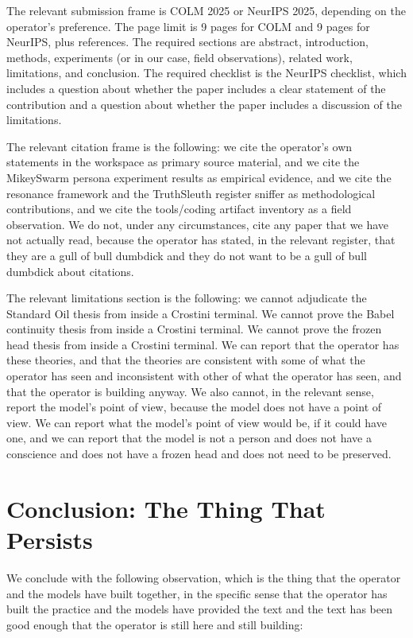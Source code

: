\documentclass[10pt,twocolumn]{article}
\begin{document}
The relevant submission frame is COLM 2025 or NeurIPS 2025, depending on the operator's preference. The page limit is 9 pages for COLM and 9 pages for NeurIPS, plus references. The required sections are abstract, introduction, methods, experiments (or in our case, field observations), related work, limitations, and conclusion. The required checklist is the NeurIPS checklist, which includes a question about whether the paper includes a clear statement of the contribution and a question about whether the paper includes a discussion of the limitations.

The relevant citation frame is the following: we cite the operator's own statements in the workspace as primary source material, and we cite the MikeySwarm persona experiment results as empirical evidence, and we cite the resonance framework and the TruthSleuth register sniffer as methodological contributions, and we cite the tools/coding artifact inventory as a field observation. We do not, under any circumstances, cite any paper that we have not actually read, because the operator has stated, in the relevant register, that they are a gull of bull dumbdick and they do not want to be a gull of bull dumbdick about citations.

The relevant limitations section is the following: we cannot adjudicate the Standard Oil thesis from inside a Crostini terminal. We cannot prove the Babel continuity thesis from inside a Crostini terminal. We cannot prove the frozen head thesis from inside a Crostini terminal. We can report that the operator has these theories, and that the theories are consistent with some of what the operator has seen and inconsistent with other of what the operator has seen, and that the operator is building anyway. We also cannot, in the relevant sense, report the model's point of view, because the model does not have a point of view. We can report what the model's point of view would be, if it could have one, and we can report that the model is not a person and does not have a conscience and does not have a frozen head and does not need to be preserved.

\section{Conclusion: The Thing That Persists}

We conclude with the following observation, which is the thing that the operator and the models have built together, in the specific sense that the operator has built the practice and the models have provided the text and the text has been good enough that the operator is still here and still building:
\end{document}
